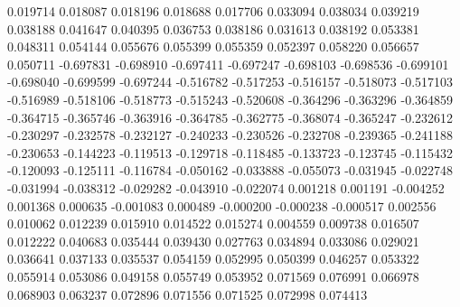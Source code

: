 0.019714
0.018087
0.018196
0.018688
0.017706
0.033094
0.038034
0.039219
0.038188
0.041647
0.040395
0.036753
0.038186
0.031613
0.038192
0.053381
0.048311
0.054144
0.055676
0.055399
0.055359
0.052397
0.058220
0.056657
0.050711
-0.697831
-0.698910
-0.697411
-0.697247
-0.698103
-0.698536
-0.699101
-0.698040
-0.699599
-0.697244
-0.516782
-0.517253
-0.516157
-0.518073
-0.517103
-0.516989
-0.518106
-0.518773
-0.515243
-0.520608
-0.364296
-0.363296
-0.364859
-0.364715
-0.365746
-0.363916
-0.364785
-0.362775
-0.368074
-0.365247
-0.232612
-0.230297
-0.232578
-0.232127
-0.240233
-0.230526
-0.232708
-0.239365
-0.241188
-0.230653
-0.144223
-0.119513
-0.129718
-0.118485
-0.133723
-0.123745
-0.115432
-0.120093
-0.125111
-0.116784
-0.050162
-0.033888
-0.055073
-0.031945
-0.022748
-0.031994
-0.038312
-0.029282
-0.043910
-0.022074
0.001218
0.001191
-0.004252
0.001368
0.000635
-0.001083
0.000489
-0.000200
-0.000238
-0.000517
0.002556
0.010062
0.012239
0.015910
0.014522
0.015274
0.004559
0.009738
0.016507
0.012222
0.040683
0.035444
0.039430
0.027763
0.034894
0.033086
0.029021
0.036641
0.037133
0.035537
0.054159
0.052995
0.050399
0.046257
0.053322
0.055914
0.053086
0.049158
0.055749
0.053952
0.071569
0.076991
0.066978
0.068903
0.063237
0.072896
0.071556
0.071525
0.072998
0.074413
